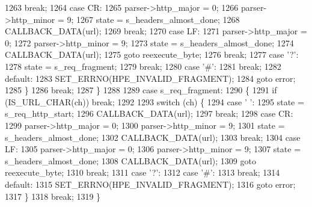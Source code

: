 \begin{DoxyCode}
1263             \textcolor{keywordflow}{break};
1264           \textcolor{keywordflow}{case} CR:
1265             parser->http_major = 0;
1266             parser->http_minor = 9;
1267             state = s_headers_almost_done;
1268             CALLBACK_DATA(url);
1269             \textcolor{keywordflow}{break};
1270           \textcolor{keywordflow}{case} LF:
1271             parser->http_major = 0;
1272             parser->http_minor = 9;
1273             state = s_headers_almost_done;
1274             CALLBACK_DATA(url);
1275             \textcolor{keywordflow}{goto} reexecute\_byte;
1276             \textcolor{keywordflow}{break};
1277           \textcolor{keywordflow}{case} \textcolor{charliteral}{'?'}:
1278             state = s_req_fragment;
1279             \textcolor{keywordflow}{break};
1280           \textcolor{keywordflow}{case} \textcolor{charliteral}{'#'}:
1281             \textcolor{keywordflow}{break};
1282           \textcolor{keywordflow}{default}:
1283             SET_ERRNO(HPE_INVALID_FRAGMENT);
1284             \textcolor{keywordflow}{goto} error;
1285         \}
1286         \textcolor{keywordflow}{break};
1287       \}
1288 
1289       \textcolor{keywordflow}{case} s_req_fragment:
1290       \{
1291         \textcolor{keywordflow}{if} (IS_URL_CHAR(ch)) \textcolor{keywordflow}{break};
1292 
1293         \textcolor{keywordflow}{switch} (ch) \{
1294           \textcolor{keywordflow}{case} \textcolor{charliteral}{' '}:
1295             state = s_req_http_start;
1296             CALLBACK_DATA(url);
1297             \textcolor{keywordflow}{break};
1298           \textcolor{keywordflow}{case} CR:
1299             parser->http_major = 0;
1300             parser->http_minor = 9;
1301             state = s_headers_almost_done;
1302             CALLBACK_DATA(url);
1303             \textcolor{keywordflow}{break};
1304           \textcolor{keywordflow}{case} LF:
1305             parser->http_major = 0;
1306             parser->http_minor = 9;
1307             state = s_headers_almost_done;
1308             CALLBACK_DATA(url);
1309             \textcolor{keywordflow}{goto} reexecute\_byte;
1310             \textcolor{keywordflow}{break};
1311           \textcolor{keywordflow}{case} \textcolor{charliteral}{'?'}:
1312           \textcolor{keywordflow}{case} \textcolor{charliteral}{'#'}:
1313             \textcolor{keywordflow}{break};
1314           \textcolor{keywordflow}{default}:
1315             SET_ERRNO(HPE_INVALID_FRAGMENT);
1316             \textcolor{keywordflow}{goto} error;
1317         \}
1318         \textcolor{keywordflow}{break};
1319       \}

\end{DoxyCode}
